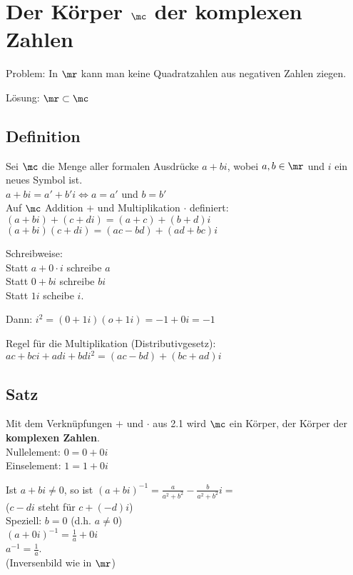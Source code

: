 \newpage
\section{Der Körper \texorpdfstring{$\mathbb{\mc}$}{C} der komplexen Zahlen}

Problem: In $\mr$ kann man keine Quadratzahlen aus negativen Zahlen ziegen.

Lösung: $\mr\subset\mc$

\subsection{Definition}
	Sei $\mc$ die Menge aller formalen Ausdrücke $a+bi$, wobei $a,b\in\mr$ und $i$ ein neues Symbol ist.\\
	$a+bi=a'+b'i\Leftrightarrow a=a'$ und $b=b'$\\
	Auf $\mc$ Addition $+$ und Multiplikation $\cdot$ definiert:\\
	$(a+bi)+(c+di)=(a+c)+(b+d)i$\\
	$(a+bi)(c+di)=(ac-bd)+(ad+bc)i$
	
	Schreibweise:\\
	Statt $a+0\cdot i$ schreibe $a$\\
	Statt $0+bi$ schreibe $bi$\\
	Statt $1i$ scheibe $i$.
	
	Dann: $i^2=(0+1i)(o+1i)=-1+0i=-1$
	
	Regel für die Multiplikation (Distributivgesetz):\\
	$ac+bci+adi+bdi^2=(ac-bd)+(bc+ad)i$
	
\subsection{Satz}
		\item Mit dem Verknüpfungen $+$ und $\cdot$ aus 2.1 wird $\mc$ ein Körper, der Körper der \textbf{komplexen Zahlen}.\\
		Nullelement: $0=0+0i$\\
		Einselement: $1=1+0i$
		\item Ist $a+bi\neq 0$, so ist $(a+bi)^{-1}=\frac{a}{a^2+b^2}-\frac{b}{a^2+b^2}i=$\\
		($c-di$ steht für $c+(-d)i$)\\
		Speziell: $b=0$ (d.h. $a\neq 0$)\\
		$(a+0i)^{-1}=\frac{1}{a}+0i$\\
		$a^{-1}=\frac{1}{a}$.\\
		(Inversenbild wie in $\mr$)
		
